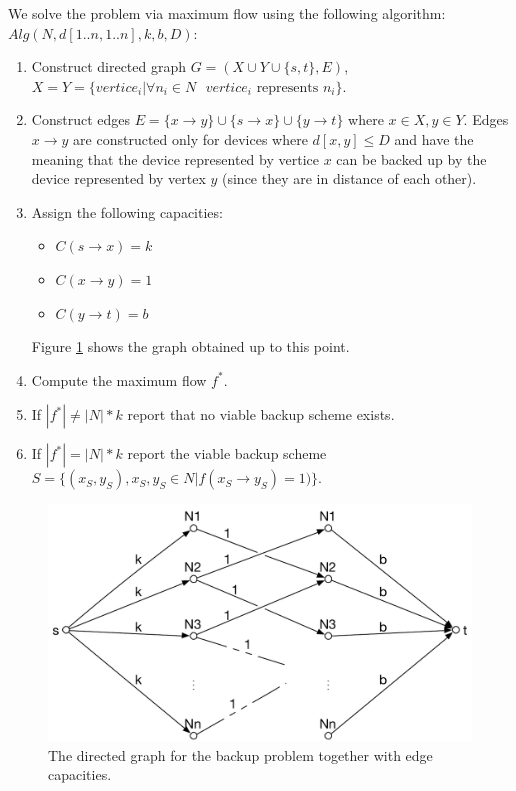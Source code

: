 We solve the problem via maximum flow using the following algorithm:
\\

$Alg(N, d[1..n, 1..n], k, b, D):$
\begin{enumerate}

	\item Construct directed graph $G=(X \cup Y \cup \{s, t\}, E)$, $ X=Y=\{ vertice_i | \forall{n_i \in N \text{ $vertice_i$ represents $n_i$}}\}$.
	
	\item Construct edges $E = \{ x \rightarrow y \} \cup \{ s \rightarrow x \} \cup \{ y \rightarrow t \}$ where $x \in X, y \in Y$. Edges  $x \rightarrow y$ are constructed only for devices where $d[x, y] \leq D$ and have the meaning that the device represented by vertice $x$ can be backed up by the device represented by vertex $y$ (since they are in distance of each other).
	
	\item Assign the following capacities:
	\begin{itemize}
	
		\item $C(s \rightarrow x) = k$
		
		\item $C(x \rightarrow y) = 1$
		
		\item $C(y \rightarrow t) = b$
	
	\end{itemize}
	
	Figure \ref{fig:graph} shows the graph obtained up to this point.
	
	\item Compute the maximum flow $f^*$.
	
	\item If $|f^*| \neq |N| * k$ report that no viable backup scheme exists.
	
	\item If ${|f^*| = |N| * k}$ report the viable backup scheme ${S = \{ (x_S, y_S), x_S, y_S \in N | f(x_S \rightarrow y_S) = 1) \}}$.

\end{enumerate}

\begin{figure}[h!]
	\centering
		\includegraphics[width=\textwidth]{problem3}
    
	\caption{The directed graph for the backup problem together with edge capacities.}
	\label{fig:graph}
\end{figure}

